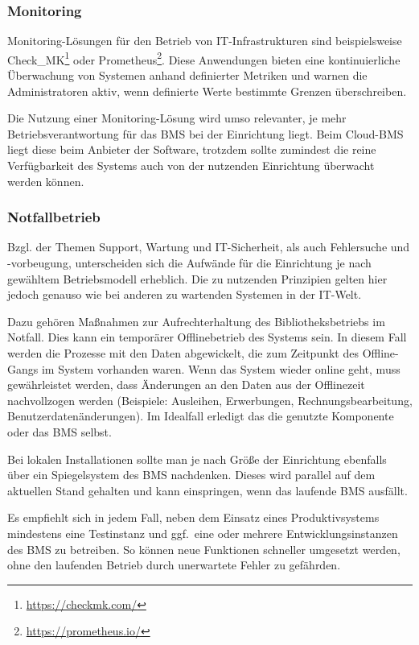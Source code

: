 \documentclass[
  11pt,
  letterpaper,
  DIV=11,
  twoside]{scrreprt}
\DeclareRobustCommand{\href}[2]{#2\footnote{\url{#1}}}
\begin{document}
\subsubsection{Monitoring}\label{monitoring}

Monitoring-Lösungen für den Betrieb von IT-Infrastrukturen sind
beispielsweise \href{https://checkmk.com/}{Check\_MK} oder
\href{https://prometheus.io/}{Prometheus}. Diese Anwendungen bieten eine
kontinuierliche Überwachung von Systemen anhand definierter Metriken und
warnen die Administratoren aktiv, wenn definierte Werte bestimmte
Grenzen überschreiben.

Die Nutzung einer Monitoring-Lösung wird umso relevanter, je mehr
Betriebsverantwortung für das BMS bei der Einrichtung liegt. Beim
Cloud-BMS liegt diese beim Anbieter der Software, trotzdem sollte
zumindest die reine Verfügbarkeit des Systems auch von der nutzenden
Einrichtung überwacht werden können.

\subsubsection{Notfallbetrieb}\label{notfallbetrieb}

Bzgl. der Themen Support, Wartung und IT-Sicherheit, als auch
Fehlersuche und -vorbeugung, unterscheiden sich die Aufwände für die
Einrichtung je nach gewähltem Betriebsmodell erheblich. Die zu nutzenden
Prinzipien gelten hier jedoch genauso wie bei anderen zu wartenden
Systemen in der IT-Welt.

Dazu gehören Maßnahmen zur Aufrechterhaltung des Bibliotheksbetriebs im
Notfall. Dies kann ein temporärer Offlinebetrieb des Systems sein. In
diesem Fall werden die Prozesse mit den Daten abgewickelt, die zum
Zeitpunkt des Offline-Gangs im System vorhanden waren. Wenn das System
wieder online geht, muss gewährleistet werden, dass Änderungen an den
Daten aus der Offlinezeit nachvollzogen werden (Beispiele: Ausleihen,
Erwerbungen, Rechnungsbearbeitung, Benutzerdatenänderungen). Im
Idealfall erledigt das die genutzte Komponente oder das BMS selbst.

Bei lokalen Installationen sollte man je nach Größe der Einrichtung
ebenfalls über ein Spiegelsystem des BMS nachdenken. Dieses wird
parallel auf dem aktuellen Stand gehalten und kann einspringen, wenn das
laufende BMS ausfällt.

Es empfiehlt sich in jedem Fall, neben dem Einsatz eines
Produktivsystems mindestens eine Testinstanz und ggf.~eine oder mehrere
Entwicklungsinstanzen des BMS zu betreiben. So können neue Funktionen
schneller umgesetzt werden, ohne den laufenden Betrieb durch unerwartete
Fehler zu gefährden.
\end{document}
